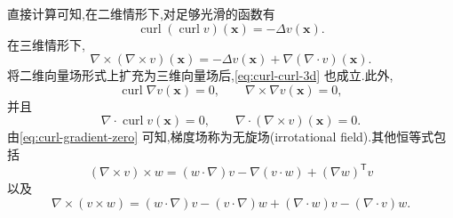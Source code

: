 \begin{note}\label{note:curl-identities}
直接计算可知,在二维情形下,对足够光滑的函数有
\begin{equation}\label{eq:curl-curl-2d}
  \operatorname{curl}(\operatorname{curl}v)(\bm{x})
     =-\Delta v(\bm{x}).
\end{equation}
在三维情形下,
\begin{equation}\label{eq:curl-curl-3d}
  \nabla\times(\nabla\times v)(\bm{x})
     =-\Delta v(\bm{x})
       +\nabla(\nabla\cdot v)(\bm{x}).
\end{equation}
将二维向量场形式上扩充为三维向量场后,\cref{eq:curl-curl-3d} 也成立.此外,
\begin{equation}\label{eq:curl-gradient-zero}
  \operatorname{curl}\nabla v(\bm{x})=0,
  \qquad \nabla\times\nabla v(\bm{x})=0,
\end{equation}
并且
\begin{equation}\label{eq:divergence-curl-zero}
  \nabla\cdot\operatorname{curl}v(\bm{x})=0,
  \qquad \nabla\cdot(\nabla\times v)(\bm{x})=0.
\end{equation}
由\cref{eq:curl-gradient-zero} 可知,梯度场称为无旋场(irrotational field).其他恒等式包括
\begin{equation}\label{eq:curl-cross-product-identity}
  (\nabla\times v)\times w
    =(w\cdot\nabla)v-\nabla(v\cdot w)+(\nabla w)^\mathsf{T}v
\end{equation}
以及
\begin{equation}\label{eq:curl-cross-product-divergence}
  \nabla\times(v\times w)
    =(w\cdot\nabla)v-(v\cdot\nabla)w
      +(\nabla\cdot w)v-(\nabla\cdot v)w.
\end{equation}
\end{note}

